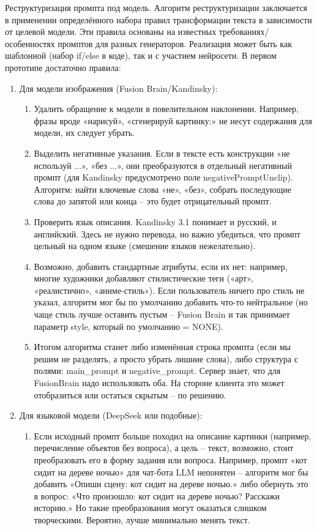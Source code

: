 Реструктуризация промпта под модель. Алгоритм реструктуризации заключается в применении определённого набора правил трансформации текста в зависимости от целевой модели. Эти правила основаны на известных требованиях/особенностях промптов для разных генераторов. Реализация может быть как шаблонной (набор if/else в коде), так и с участием нейросети. В первом прототипе достаточно правила:
\begin{enumerate}[label=\arabic*]
    \item Для модели изображения (Fusion Brain/Kandinsky):\begin{enumerate}[label=1.\arabic*]
        \item Удалить обращение к модели в повелительном наклонении. Например, фразы вроде «нарисуй», «сгенерируй картинку:» не несут содержания для модели, их следует убрать.
        \item Выделить негативные указания. Если в тексте есть конструкции «не используй ...», «без ...», они преобразуются в отдельный негативный промпт (для Kandinsky предусмотрено поле negativePromptUnclip). Алгоритм: найти ключевые слова «не», «без», собрать последующие слова до запятой или конца – это будет отрицательный промпт.
        \item Проверить язык описания. Kandinsky 3.1 понимает и русский, и английский\cite{fusionbrain:docs}. Здесь не нужно перевода, но важно убедиться, что промпт цельный на одном языке (смешение языков нежелательно).
        \item Возможно, добавить стандартные атрибуты, если их нет: например, многие художники добавляют стилистические теги («арт», «реалистично», «аниме-стиль»). Если пользователь ничего про стиль не указал, алгоритм мог бы по умолчанию добавить что-то нейтральное (но чаще стиль лучше оставить пустым – Fusion Brain и так принимает параметр style, который по умолчанию = NONE).
        \item Итогом алгоритма станет либо изменённая строка промпта (если мы решим не разделять, а просто убрать лишние слова), либо структура с полями: main\_prompt и negative\_prompt. Сервер знает, что для FusionBrain надо использовать оба. На стороне клиента это может отобразиться или остаться скрытым – по решению.
    \end{enumerate}
    \item Для языковой модели (DeepSeek или подобные): 
    \begin{enumerate}[label=2.\arabic*]
        \item Если исходный промпт больше походил на описание картинки (например, перечисление объектов без вопроса), а цель – текст, возможно, стоит преобразовать его в форму задания или вопроса. Например, промпт «кот сидит на дереве ночью» для чат-бота LLM непонятен – алгоритм мог бы добавить «Опиши сцену: кот сидит на дереве ночью.» либо обернуть это в вопрос: «Что произошло: кот сидит на дереве ночью? Расскажи историю.» Но такие преобразования могут оказаться слишком творческими. Вероятно, лучше минимально менять текст.

\end{enumerate}
\end{enumerate}
